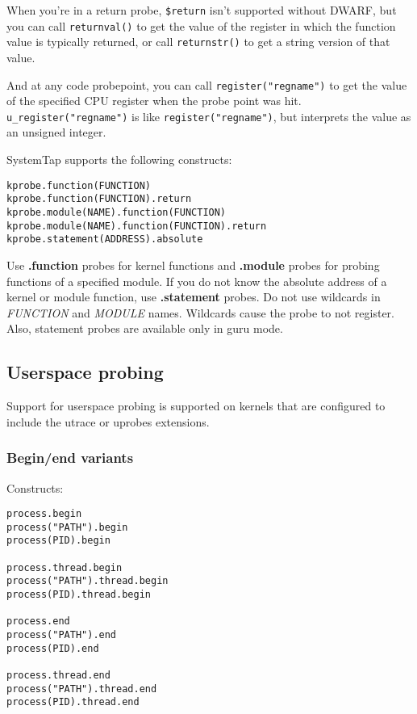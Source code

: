 \documentclass[twoside,english]{article}
\newenvironment{vindent}
{\begin{list}{}{\setlength{\listparindent}{6pt}}
\item[]}
{\end{list}}
\begin{document}
When you're in a return probe, \texttt{\$return} isn't supported
without DWARF, but you can call \texttt{returnval()} to get the value
of the register in which the function value is typically returned, or
call \texttt{returnstr()} to get a string version of that value.

And at any code probepoint, you can call
\texttt{{register("regname")}} to get the value of the specified CPU
register when the probe point was hit.
\texttt{u\_register("regname")} is like \texttt{register("regname")},
but interprets the value as an unsigned integer.

SystemTap supports the following constructs:
\begin{vindent}
\begin{verbatim}
kprobe.function(FUNCTION)
kprobe.function(FUNCTION).return
kprobe.module(NAME).function(FUNCTION)
kprobe.module(NAME).function(FUNCTION).return
kprobe.statement(ADDRESS).absolute
\end{verbatim}
\end{vindent}

Use \textbf{.function} probes for kernel functions and
\textbf{.module} probes for probing functions of a specified module.
If you do not know the absolute address of a kernel or module
function, use \textbf{.statement} probes. Do not use wildcards in
\textit{FUNCTION} and \textit{MODULE} names. Wildcards cause the probe
to not register. Also, statement probes are available only in guru mode.


\subsection{Userspace probing}
Support for userspace probing is supported on kernels that are
configured to include the utrace or uprobes extensions.

\subsubsection{Begin/end variants}
\label{sec:beginendvariants}
Constructs:
\begin{vindent}
\begin{verbatim}
process.begin
process("PATH").begin
process(PID).begin

process.thread.begin
process("PATH").thread.begin
process(PID).thread.begin

process.end
process("PATH").end
process(PID).end

process.thread.end
process("PATH").thread.end
process(PID).thread.end
\end{verbatim}
\end{vindent}
\end{document}
